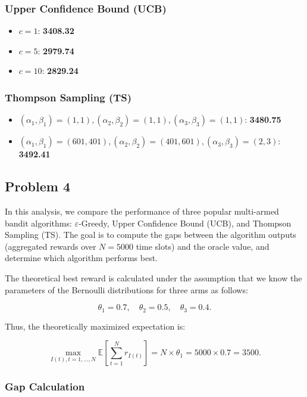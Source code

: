 \documentclass[11pt]{article}
\begin{document}
\subsubsection*{Upper Confidence Bound (UCB)}
\begin{itemize}
    \item \(c = 1\): \textbf{3408.32}
    \item \(c = 5\): \textbf{2979.74}
    \item \(c = 10\): \textbf{2829.24}
\end{itemize}

\subsubsection*{Thompson Sampling (TS)}
\begin{itemize}
    \item \((\alpha_1, \beta_1) = (1,1), (\alpha_2, \beta_2) = (1,1), (\alpha_3, \beta_3) = (1,1)\): \textbf{3480.75}
    \item \((\alpha_1, \beta_1) = (601,401), (\alpha_2, \beta_2) = (401,601), (\alpha_3, \beta_3) = (2,3)\): \textbf{3492.41}
\end{itemize}

\newpage
\subsection{Problem 4}
In this analysis, we compare the performance of three popular multi-armed bandit algorithms: \(\varepsilon\)-Greedy, Upper Confidence Bound (UCB), and Thompson Sampling (TS). The goal is to compute the gaps between the algorithm outputs (aggregated rewards over \( N = 5000 \) time slots) and the oracle value, and determine which algorithm performs best.

The theoretical best reward is calculated under the assumption that we know the parameters of the Bernoulli distributions for three arms as follows:

\[
\theta_1 = 0.7, \quad \theta_2 = 0.5, \quad \theta_3 = 0.4.
\]

Thus, the theoretically maximized expectation is:

\[
\max_{I(t), t = 1, \dots, N} \mathbb{E} \left[ \sum_{t=1}^{N} r_{I(t)} \right] = N \times \theta_1 = 5000 \times 0.7 = 3500.
\]

\subsubsection*{Gap Calculation}
\end{document}
